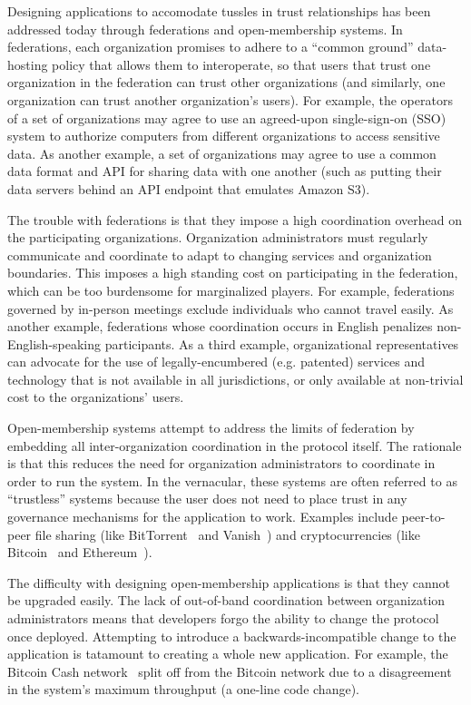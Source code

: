 Designing applications to accomodate tussles in trust relationships has been
addressed today through federations and open-membership systems.
In federations, each organization promises to adhere to a
``common ground'' data-hosting policy that allows them to interoperate, so that
users that trust one organization in the federation can trust other
organizations (and similarly, one organization can trust another organization's
users).  For example, the operators of a set of organizations may agree to use an agreed-upon
single-sign-on (SSO) system to authorize computers from different organizations
to access sensitive data.  As another example, a set of organizations may agree
to use a common data format and API for sharing data with one another (such as
putting their data servers behind an API endpoint that emulates Amazon S3).

The trouble with federations is that they impose a high coordination overhead on
the participating organizations.  Organization administrators must regularly
communicate and coordinate to adapt to changing services and organization
boundaries.  This imposes a high standing cost on participating in the
federation, which can be too burdensome for marginalized players.  For example,
federations governed by in-person meetings exclude individuals who cannot
travel easily.  As another example, federations whose coordination occurs in English
penalizes non-English-speaking participants.  As a third example, organizational
representatives can advocate for the use of legally-encumbered (e.g. patented)
services and technology that is not available in all jurisdictions, or only
available at non-trivial cost to the organizations' users.

Open-membership systems attempt to address the limits of federation by embedding
all inter-organization coordination in the protocol itself.  The rationale is
that this reduces the need for organization administrators to coordinate in
order to run the system.  In the vernacular, these systems are often referred to
as ``trustless'' systems because the user does not need to place trust in any
governance mechanisms for the application to work.  Examples include peer-to-peer file sharing
(like BitTorrent~\cite{bittorrent} and Vanish~\cite{vanish}) and cryptocurrencies (like
Bitcoin~\cite{bitcoin} and Ethereum~\cite{ethereum}).

The difficulty with designing open-membership applications is that they cannot
be upgraded easily.  The lack of out-of-band coordination between organization
administrators means that developers forgo the ability to change the protocol
once deployed.  Attempting to introduce a backwards-incompatible change to the
application is tatamount to creating a whole new application.  For example,
the Bitcoin Cash network~\cite{bcash} split off from the Bitcoin network 
due to a disagreement in the system's maximum throughput (a one-line code
change).

